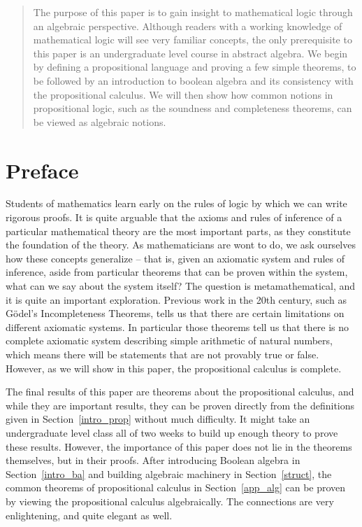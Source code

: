 \documentclass[11pt,titlepage]{article}
\theoremstyle{definition}
\begin{document}


\begin{abstract}
The purpose of this paper is to gain insight to mathematical logic through an algebraic perspective. Although readers with a working knowledge of mathematical logic will see very familiar concepts, the only prerequisite to this paper is an undergraduate level course in abstract algebra. We begin by defining a propositional language and proving a few simple theorems, to be followed by an introduction to boolean algebra and its consistency with the propositional calculus. We will then show how common notions in propositional logic, such as the soundness and completeness theorems, can be viewed as algebraic notions.
\end{abstract}

\tableofcontents
\newpage

    \section*{Preface}
      
Students of mathematics learn early on the rules of logic by which we can write rigorous proofs. It is quite arguable that the axioms and rules of inference of a particular mathematical theory are the most important parts, as they constitute the foundation of the theory. As mathematicians are wont to do, we ask ourselves how these concepts generalize -- that is, given an axiomatic system and rules of inference, aside from particular theorems that can be proven within the system, what can we say about the system itself? The question is metamathematical, and it is quite an important exploration. Previous work in the 20th century, such as G\"odel's Incompleteness Theorems, tells us that there are certain limitations on different axiomatic systems. In particular those theorems tell us that there is no complete axiomatic system describing simple arithmetic of natural numbers, which means there will be statements that are not provably true or false. However, as we will show in this paper, the propositional calculus is complete.

The final results of this paper are theorems about the propositional calculus, and while they are important results, they can be proven directly from the definitions given in Section~\ref{intro_prop} without much difficulty. It might take an undergraduate level class all of two weeks to build up enough theory to prove these results. However, the importance of this paper does not lie in the theorems themselves, but in their proofs. After introducing Boolean algebra in Section~\ref{intro_ba} and building algebraic machinery in Section~\ref{struct}, the common theorems of propositional calculus in Section~\ref{app_alg} can be proven by viewing the propositional calculus algebraically. The connections are very enlightening, and quite elegant as well.
\end{document}
